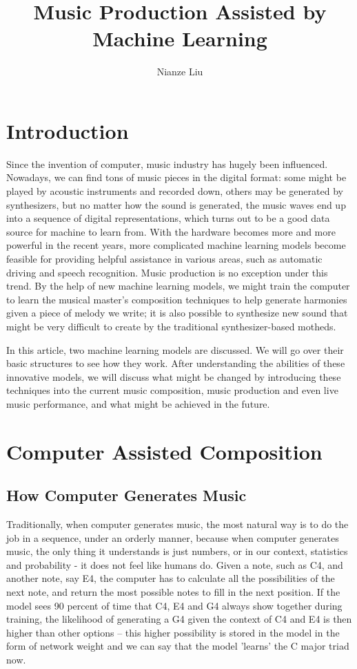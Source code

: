\documentclass[jou]{apa6}
\title{Music Production Assisted by Machine Learning}
\author{Nianze Liu}
\affiliation{New York University}
\begin{document}
\maketitle

\section{Introduction}

Since the invention of computer, music industry has hugely been influenced. Nowadays, we can find tons of music pieces in the digital format: some might be played by acoustic instruments and recorded down, others may be generated by synthesizers, but no matter how the sound is generated, the music waves end up into a sequence of digital representations, which turns out to be a good data source for machine to learn from. With the hardware becomes more and more powerful in the recent years, more complicated machine learning models become feasible for providing helpful assistance in various areas, such as automatic driving and speech recognition. Music production is no exception under this trend. By the help of new machine learning models, we might train the computer to learn the musical master's composition techniques to help generate harmonies given a piece of melody we write; it is also possible to synthesize new sound that might be very difficult to create by the traditional synthesizer-based motheds.

In this article, two machine learning models are discussed. We will go over their basic structures to see how they work. After understanding the abilities of these innovative models, we will discuss what might be changed by introducing these techniques into the current music composition, music production and even live music performance, and what might be achieved in the future.

\section{Computer Assisted Composition}

\subsection{How Computer Generates Music}

Traditionally, when computer generates music, the most natural way is to do the job in a sequence, under an orderly manner, because when computer generates music, the only thing it understands is just numbers, or in our context, statistics and probability - it does not feel like humans do. Given a note, such as C4, and another note, say E4, the computer has to calculate all the possibilities of the next note, and return the most possible notes to fill in the next position. If the model sees 90 percent of time that C4, E4 and G4 always show together during training, the likelihood of generating a G4 given the context of C4 and E4 is then higher than other options -- this higher possibility is stored in the model in the form of network weight and we can say that the model 'learns' the C major triad now. 
\end{document}
